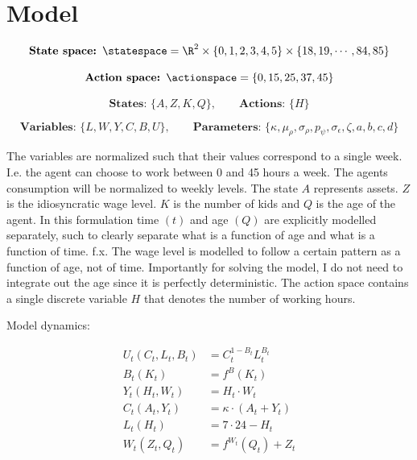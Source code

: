 \section{Model}

\begin{equation}
    \textbf{State space: }\statespace = \R^{2} \times \{0, 1, 2, 3, 4, 5\} \times \{ 18, 19, \cdots , 84, 85\}
\end{equation}

\begin{equation}
    \textbf{Action space: }\actionspace  = \{0, 15, 25, 37, 45\}
\end{equation}

\begin{equation}
    \textbf{States: }\{A, Z, K, Q\}, \qquad \textbf{Actions: } \{H\} 
\end{equation}

\begin{equation}
    \textbf{Variables: }\{L, W, Y, C, B, U\},  \qquad \textbf{Parameters: } \{\kappa, \mu_\rho, \sigma_\rho, p_\psi, \sigma_\epsilon, \zeta, a, b, c, d\}
\end{equation}

The variables are normalized such that their values correspond to a single week. I.e. the agent can choose to work between 0 and 45 hours a week. The agents consumption will be normalized to weekly levels. The state $A$ represents assets. $Z$ is the idiosyncratic wage level. $K$ is the number of kids and $Q$ is the age of the agent. In this formulation time $(t)$ and age $(Q)$ are explicitly modelled separately, such to clearly separate what is a function of age and what is a function of time. f.x. The wage level is modelled to follow a certain pattern as a function of age, not of time. Importantly for solving the model, I do not need to integrate out the age since it is perfectly deterministic. The action space contains a single discrete variable $H$ that denotes the number of working hours.

Model dynamics:

\begin{align}
    U_t (C_t, L_t, B_t) &= C_t^{1-B_t}L_t^{B_t} \label{eq:utility_v1}\\
    B_t (K_t) &= f^{B}(K_t) \label{eq:alpha_v1}\\
    Y_t ( H_t, W_t) &= H_t \cdot W_t \label{eq:salary_v1}\\
    C_t (A_t, Y_t) &= \kappa \cdot (A_t + Y_t) \label{eq:consumption_v1}\\
    L_t(H_t) &= 7 \cdot 24 - H_t \label{eq:leisure_v1}\\
    W_t(Z_t, Q_t) &= f^{W_t}(Q_t) + Z_t \label{eq:wage_v1}
\end{align}

